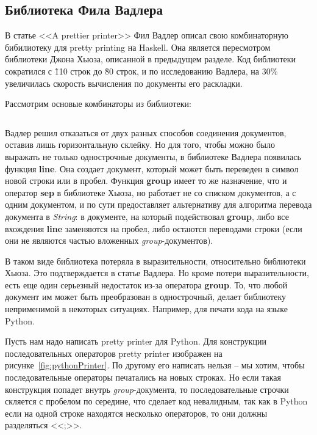 \newpage

\subsection{Библиотека Фила Вадлера}

В статье <<A prettier printer>>\cite{wadler} Фил Вадлер описал свою комбинаторную бибилиотеку для pretty printing на Haskell. Она является пересмотром библиотеки Джона Хьюза, описанной в предыдущем разделе. Код библиотеки сократился с \~110 строк до \~80 строк, и по исследованию Вадлера, на 30\% увеличилась скорость вычисления по документы его раскладки.

Рассмотрим основые комбинаторы из библиотеки:
\inputminted{haskell}{codes/wadlerBasicOperations.hs}

Вадлер решил отказаться от двух разных способов соединения документов, оставив лишь горизонтальную склейку. Но для того, чтобы можно было выражать не только однострочные документы, в библиотеке Вадлера появилась функция \textbf{line}. Она создает документ, который может быть переведен в символ новой строки или в пробел.
Функция \textbf{group} имеет то же назначение, что и оператор \textbf{sep} в библиотеке Хьюза, но работает не со списком документов, а с одним документом, и по сути предоставляет альтернативу для алгоритма перевода документа в \textit{String}: в документе, на который подействовал \textbf{group}, либо все вхождения \textbf{line} заменяются на пробел, либо остаются переводами строки (если они не являются частью вложенных \textit{group}-документов).

В таком виде библиотека потеряла в выразительности, относительно библиотеки Хьюза. Это подтверждается в статье Вадлера. Но кроме потери выразительности, есть еще один серьезный недостаток из-за оператора \textbf{group}. То, что любой документ им может быть преобразован в однострочный, делает библиотеку неприменимой в некоторых ситуациях. Например, для печати кода на языке Python.

Пусть нам надо написать pretty printer для Python. Для конструкции последовательных операторов pretty printer изображен на рисунке~\ref{fig:pythonPrinter}.
По другому его написать нельзя -- мы хотим, чтобы последовательные операторы печатались на новых строках. Но если такая конструкция попадет внутрь \textit{group}-документа, то последовательные строчки скляется с пробелом по середине, что сделает код невалидным, так как в Python если на одной строке находятся несколько операторов, то они должны разделяться <<;>>.


